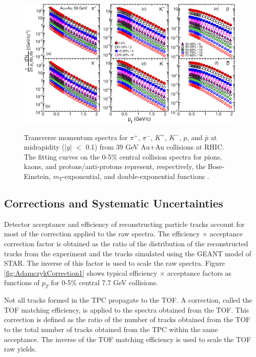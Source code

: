 \begin{figure}[h]
  \centering
  \includegraphics[width=6.5in]{../figures/PhysRevC-96-044904_pTSpectra_39.png}\\
  \caption{Transverse momentum spectra for $\pi^{+}$, $\pi^{-}$, $K^+$, $K^{-}$, $p$, and $\bar{p}$ at midrapidity ($|y|$ $<$ 0.1) from 39 GeV Au+Au collisions at RHIC. The fitting curves on the 0-5\% central collision spectra for pions, kaons, and protons/anti-protons represent, respectively, the Bose-Einstein, $m_{T}$-exponential, and double-exponential functions \cite{PhysRevC.96.044904}.}\label{fig:BESPaper_pTSpectra}
\end{figure}

\subsection{Corrections and Systematic Uncertainties}
Detector acceptance and efficiency of reconstructing particle tracks account for most of the correction applied to the raw spectra. The efficiency $\times$ acceptance correction factor is obtained as the ratio of the distribution of the reconstructed tracks from the experiment and the tracks simulated using the GEANT model of STAR. The inverse of this factor is used to scale the raw spectra. Figure \ref{fig:AdamczykCorrection1} shows typical efficiency $\times$ acceptance factors as functions of $p_{T}$ for 0-5\% central 7.7 GeV collisions.

Not all tracks formed in the TPC propagate to the TOF. A correction, called the TOF matching efficiency, is applied to the spectra obtained from the TOF. This correction is defined as the ratio of the number of tracks obtained from the TOF to the total number of tracks obtained from the TPC within the same acceptance. The inverse of the TOF matching efficiency is used to scale the TOF raw yields.

